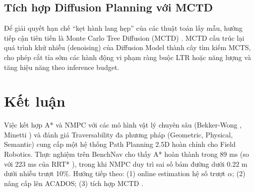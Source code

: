 \documentclass[12pt, a4paper]{article}
\begin{document}
\subsection{Tích hợp Diffusion Planning với MCTD}
Để giải quyết hạn chế ``kẹt hành lang hẹp'' của các thuật toán lấy mẫu, hướng tiếp cận tiên tiến là Monte Carlo Tree Diffusion (MCTD) \cite{yoon2025}. MCTD cấu trúc lại quá trình khử nhiễu (denoising) của Diffusion Model thành cây tìm kiếm MCTS, cho phép cắt tỉa sớm các hành động vi phạm ràng buộc LTR hoặc năng lượng và tăng hiệu năng theo inference budget.

\section{Kết luận}
Việc kết hợp A* \cite{hart1968} và NMPC với các mô hình vật lý chuyên sâu (Bekker-Wong \cite{bekker1956}, Minetti \cite{minetti2002}) và đánh giá Traversability đa phương pháp (Geometric, Physical, Semantic) \cite{triebel2006} cung cấp một hệ thống Path Planning 2.5D hoàn chỉnh cho Field Robotics. Thực nghiệm trên BenchNav \cite{endo2024} cho thấy A* hoàn thành trong 89 ms (so với 223 ms của RRT* \cite{karaman2011}), trong khi NMPC \cite{grandia2023, andersson2019} duy trì sai số bám đường dưới 0.22 m dưới nhiễu trượt 10\%. Hướng tiếp theo: (1) online estimation hệ số trượt $\alpha$; (2) nâng cấp lên ACADOS; (3) tích hợp MCTD \cite{yoon2025}.



\end{document}
